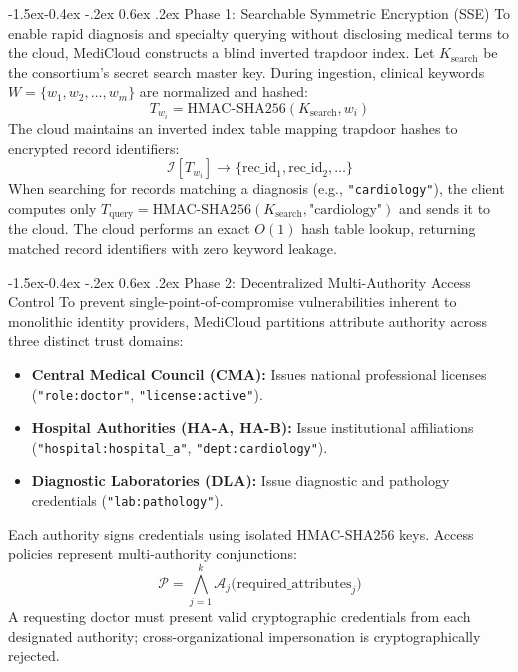 \documentclass[10pt,twocolumn]{article}
\makeatletter
\renewcommand\subsection{\@startsection{subsection}{2}{\z@}%
  {-1.5ex\@plus -0.4ex \@minus -.2ex}%
  {0.6ex \@plus .2ex}%
  {\normalfont\normalsize\bfseries\itshape\color{accent}}}
\makeatother
\begin{document}
\subsection{Phase 1: Searchable Symmetric Encryption (SSE)}
To enable rapid diagnosis and specialty querying without disclosing medical terms to the cloud, MediCloud constructs a blind inverted trapdoor index. Let $K_{\text{search}}$ be the consortium's secret search master key. During ingestion, clinical keywords $W = \{w_1, w_2, \dots, w_m\}$ are normalized and hashed:
\begin{equation}
    T_{w_i} = \text{HMAC-SHA256}(K_{\text{search}}, w_i)
\end{equation}
The cloud maintains an inverted index table mapping trapdoor hashes to encrypted record identifiers:
\begin{equation}
    \mathcal{I}[T_{w_i}] \longrightarrow \{\text{rec\_id}_1, \text{rec\_id}_2, \dots\}
\end{equation}
When searching for records matching a diagnosis (e.g., \texttt{"cardiology"}), the client computes only $T_{\text{query}} = \text{HMAC-SHA256}(K_{\text{search}}, \text{"cardiology"})$ and sends it to the cloud. The cloud performs an exact $O(1)$ hash table lookup, returning matched record identifiers with zero keyword leakage.

\subsection{Phase 2: Decentralized Multi-Authority Access Control}
To prevent single-point-of-compromise vulnerabilities inherent to monolithic identity providers, MediCloud partitions attribute authority across three distinct trust domains:
\begin{itemize}
    \item \textbf{Central Medical Council (CMA):} Issues national professional licenses (\texttt{"role:doctor"}, \texttt{"license:active"}).
    \item \textbf{Hospital Authorities (HA-A, HA-B):} Issue institutional affiliations (\texttt{"hospital:hospital\_a"}, \texttt{"dept:cardiology"}).
    \item \textbf{Diagnostic Laboratories (DLA):} Issue diagnostic and pathology credentials (\texttt{"lab:pathology"}).
\end{itemize}
Each authority signs credentials using isolated HMAC-SHA256 keys. Access policies represent multi-authority conjunctions:
\begin{equation}
    \mathcal{P} = \bigwedge_{j=1}^k \mathcal{A}_j \big( \text{required\_attributes}_j \big)
\end{equation}
A requesting doctor must present valid cryptographic credentials from each designated authority; cross-organizational impersonation is cryptographically rejected.
\end{document}
